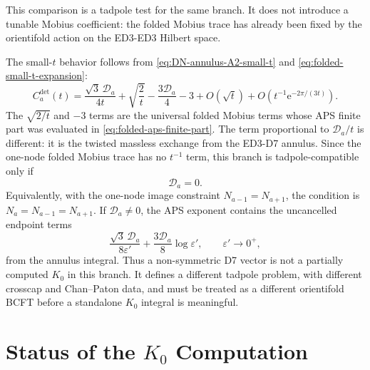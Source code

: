 \documentclass[11pt]{article}
\newcommand{\e}{\mathrm{e}}
\newcommand{\eps}{\varepsilon}
\begin{document}
This comparison is a tadpole test for the same branch. It does not introduce a tunable Mobius
coefficient: the folded Mobius trace has already been fixed by the orientifold action on the
ED3-ED3 Hilbert space.

The small-\(t\) behavior follows from \eqref{eq:DN-annulus-A2-small-t} and
\eqref{eq:folded-small-t-expansion}:
\begin{equation}
  C_a^{\det}(t)
  =
  \frac{\sqrt3\,\mathcal D_a}{4t}
  +
  \sqrt{\frac2t}
  -
  \frac{3\mathcal D_a}{4}
  -3
  +O(\sqrt t)
  +O\!\left(t^{-1}\e^{-2\pi/(3t)}\right).
  \label{eq:completed-branch-small-t}
\end{equation}
The \(\sqrt{2/t}\) and \(-3\) terms are the universal folded Mobius terms whose APS finite part
was evaluated in \eqref{eq:folded-aps-finite-part}.  The term proportional to
\(\mathcal D_a/t\) is different: it is the twisted massless exchange from the ED3-D7 annulus.
Since the one-node folded Mobius trace has no \(t^{-1}\) term, this branch is tadpole-compatible
only if
\begin{equation}
  \mathcal D_a=0.
  \label{eq:completed-branch-tadpole-condition}
\end{equation}
Equivalently, with the one-node image constraint \(N_{a-1}=N_{a+1}\), the condition is
\(N_a=N_{a-1}=N_{a+1}\).  If \(\mathcal D_a\ne0\), the APS exponent contains the uncancelled
endpoint terms
\begin{equation}
  \frac{\sqrt3\,\mathcal D_a}{8\eps'}
  +
  \frac{3\mathcal D_a}{8}\log\eps',
  \qquad \eps'\to0^+,
  \label{eq:uncancelled-Da-divergence}
\end{equation}
from the annulus integral.  Thus a non-symmetric D7 vector is not a partially computed
\(K_0\) in this branch. It defines a different tadpole problem, with different crosscap and
Chan--Paton data, and must be treated as a different orientifold BCFT before a standalone
\(K_0\) integral is meaningful.


\section{Status of the \texorpdfstring{$K_0$}{K0} Computation}
\end{document}
